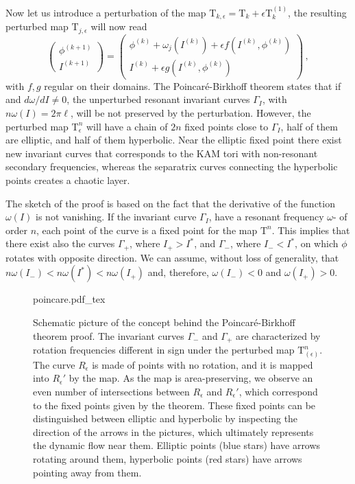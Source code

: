 Now let us introduce a perturbation of the map $\mathrm{T}_{k,\epsilon} = \mathrm{T}_k + \epsilon \mathrm{T}^{(1)}_k$, the resulting perturbed map $\mathrm{T}_{j,\epsilon}$ will now read
\begingroup
\renewcommand*{\arraystretch}{1.5}
\begin{equation}
	\begin{pmatrix} \phi^{(k+1)} \\ I^{(k+1)} \end{pmatrix}  = \begin{pmatrix} \phi^{(k)} + \omega_j\left(I^{(k)}\right) + \epsilon f(I^{(k)}, \phi^{(k)}) \\ I^{(k)}  + \epsilon g(I^{(k)}, \phi^{(k)}) \end{pmatrix} \, ,
    \label{eq:area_perturbed_map}
\end{equation}
\endgroup
with $f, g$ regular on their domains. The Poincaré-Birkhoff theorem states that if and $d\omega/dI\ne 0$, the unperturbed resonant invariant curves $\Gamma_I$, with $n\omega(I)=2\pi \ell$, will be not preserved by the perturbation. However, the perturbed map $\mathrm{T}^n_{\epsilon}$ will have a chain of $2n$ fixed points close to $\Gamma_I$, half of them are elliptic, and half of them hyperbolic. Near the elliptic fixed point there exist new invariant curves that corresponds to the KAM tori with non-resonant secondary frequencies, whereas the separatrix curves connecting the hyperbolic points creates a chaotic layer.

The sketch of the proof is based on the fact that the derivative of the function $\omega(I)$ is not vanishing.  If the invariant curve $\Gamma_{I}$, have a resonant frequency $\omega$- of order $n$, each point of the curve is a fixed point for the map $\mathrm{T}^n$. This implies that there exist also the curves $\Gamma_+$, where $I_+>I^*$, and $\Gamma_-$, where $I_-<I^*$, on which $\phi$ rotates with opposite direction. We can assume, without loss of generality, that $n\omega(I_-)<n\omega(I^*)<n\omega(I_+)$ and, therefore, $\omega(I_-)<0$ and $\omega(I_+)>0$.

\begin{figure}[t]
	\centering
	\def\svgwidth{0.75\columnwidth}
    {poincare.pdf_tex}
    \caption{Schematic picture of the concept behind the Poincaré-Birkhoff theorem proof. The invariant curves $\Gamma_-$ and $\Gamma_+$ are characterized by rotation frequencies different in sign under the perturbed map $\mathrm{T}^n_(\epsilon)$. The curve $R_\epsilon$ is made of points with no rotation, and it is mapped into $R_\epsilon'$ by the map. As the map is area-preserving, we observe an even number of intersections between $R_\epsilon$ and $R_\epsilon'$, which correspond to the fixed points given by the theorem. These fixed points can be distinguished between elliptic and hyperbolic by inspecting the direction of the arrows in the pictures, which ultimately represents the dynamic flow near them. Elliptic points (blue stars) have arrows rotating around them, hyperbolic points (red stars) have arrows pointing away from them.}
    \label{fig:tnepsilon}
\end{figure}

